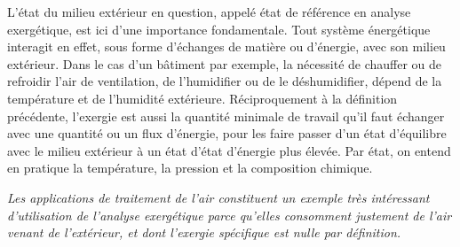 \documentclass[a4paper,11pt]{scrartcl}
\begin{document}
L’état du milieu extérieur en question, appelé état de référence en analyse exergétique, est ici d’une importance fondamentale. Tout système énergétique interagit en effet, sous forme d’échanges de matière ou d'énergie, avec son milieu extérieur. Dans le cas d'un bâtiment par exemple, la nécessité de chauffer ou de refroidir l'air de ventilation, de l'humidifier ou de le déshumidifier, dépend de la température et de l'humidité extérieure. Réciproquement à la définition précédente, l'exergie est aussi la quantité minimale de travail qu'il faut échanger avec une quantité ou un flux d'énergie, pour les faire passer d'un état d'équilibre avec le milieu extérieur à un état d’état d'énergie plus élevée. Par état, on entend en pratique la température, la pression et la composition chimique.

\textsl{Les applications de traitement de l'air constituent un exemple très intéressant d'utilisation de l'analyse exergétique parce qu'elles consomment justement de l'air venant de l’extérieur, et dont l'exergie spécifique est nulle par définition.}
\printbibliography
\end{document}
